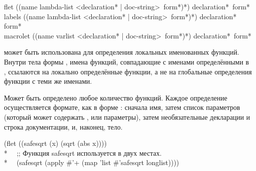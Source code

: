 \begin{defmac}
flet ({(name lambda-list
        <{declaration}* | doc-string> {\,form}*)}*)
     {declaration}* {\,form}* \\
labels ({(name lambda-list
          <{declaration}* | doc-string> {\,form}*)}*)
       {declaration}* {\,form}* \\
macrolet ({(name varlist
            <{declaration}* | doc-string> {\,form}*)}*)
         {declaration}* {\,form}*

 может быть использована для определения локальных именованных
функций. Внутри тела формы , имена функций, совпадающие с именами
определёнными в , ссылаются на локально определённые функции, а не на
глобальные определения функции с теми же именами.

Может быть определено любое количество функций. Каждое определение
осуществляется формате, как в форме : сначала имя, затем список
параметров (который может содержать ,  или 
параметры), затем необязательные декларации и строка документации, и, наконец,
тело.
\begin{lisp}
(flet ((safesqrt (x) (sqrt (abs x)))) \\*
~~;; Функция safesqrt используется в двух местах. \\*
~~(safesqrt (apply \#'+ (map 'list \#'safesqrt longlist))))
\end{lisp}


\end{defmac}
